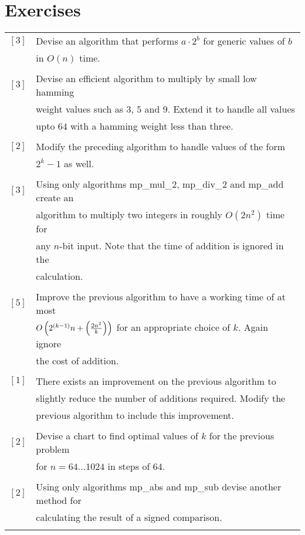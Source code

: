 \documentclass[b5paper]{book}
\begin{document}
\section*{Exercises}
\begin{tabular}{cl}
$\left [ 3 \right ] $ & Devise an algorithm that performs $a \cdot 2^b$ for generic values of $b$ \\
                      & in $O(n)$ time. \\
                      &\\
$\left [ 3 \right ] $ & Devise an efficient algorithm to multiply by small low hamming  \\
                      & weight values such as $3$, $5$ and $9$.  Extend it to handle all values \\
                      & upto $64$ with a hamming weight less than three. \\
                      &\\
$\left [ 2 \right ] $ & Modify the preceding algorithm to handle values of the form \\
                      & $2^k - 1$ as well. \\
                      &\\
$\left [ 3 \right ] $ & Using only algorithms mp\_mul\_2, mp\_div\_2 and mp\_add create an \\
                      & algorithm to multiply two integers in roughly $O(2n^2)$ time for \\
                      & any $n$-bit input.  Note that the time of addition is ignored in the \\
                      & calculation.  \\
                      & \\
$\left [ 5 \right ] $ & Improve the previous algorithm to have a working time of at most \\
                      & $O \left (2^{(k-1)}n + \left ({2n^2 \over k} \right ) \right )$ for an appropriate choice of $k$.  Again ignore \\
                      & the cost of addition. \\
                      & \\
$\left [ 1 \right ] $ & There exists an improvement on the previous algorithm to \\
                      & slightly reduce the number of additions required.  Modify the \\
                      & previous algorithm to include this improvement. \\
                      & \\
$\left [ 2 \right ] $ & Devise a chart to find optimal values of $k$ for the previous problem \\
                      & for $n = 64 \ldots 1024$ in steps of $64$. \\
                      & \\
$\left [ 2 \right ] $ & Using only algorithms mp\_abs and mp\_sub devise another method for \\
                      & calculating the result of a signed comparison. \\
                      &
\end{tabular}
\end{document}
